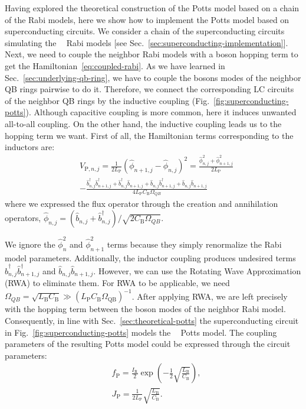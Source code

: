 \documentclass[reprint, aps, prx, amsmath, amssymb, longbibliography, superscriptaddress]{revtex4-2}
\DeclareMathOperator{\Zthree}{\mathbb{Z}_3}
\begin{document}
Having explored the theoretical construction of the Potts model based on a chain of the Rabi models, here we show how to implement the Potts model based on superconducting circuits. We consider a chain of the superconducting circuits simulating the $\Zthree$ Rabi models [see Sec.~\ref{sec:superconducting-implementation}]. Next, we need to couple the neighbor Rabi models with a boson hopping term to get the Hamiltonian~\eqref{eq:coupled-rabi}. As we have learned in Sec.~\ref{sec:underlying-qb-ring}, we have to couple the bosons modes of the neighbor QB rings pairwise to do it. Therefore, we connect the corresponding LC circuits of the neighbor QB rings by the inductive coupling (Fig.~\ref{fig:superconducting-potts}). Although capacitive coupling is more common, here it induces unwanted  all-to-all coupling. On the other hand, the inductive coupling leads us to the hopping term we want. First of all, the Hamiltonian terms corresponding to the inductors are:
\begin{equation}
\begin{aligned}
    &V_{\text{P},n,j} = \frac{1}{2L_{\text{P}}} (\hat \phi_{n+1,j} - \hat \phi_{n,j})^2 = \frac{\hat \phi_{n,j}^2 + \hat \phi_{n+1,j}^2}{2L_{\text{P}}} \\
    &- \frac{\hat b^{\dagger}_{n,j} \hat b^{\dagger}_{n+1,j} + \hat b^{\dagger}_{n,j} \hat b_{n+1,j} + \hat b_{n,j} \hat b^{\dagger}_{n+1,j} + \hat b_{n,j} \hat b_{n+1,j}}{4L_{\text{P}}C_{\text{B}}\Omega_{QB}} 
\end{aligned}
\end{equation}
where we expressed the flux operator through the creation and annihilation operators, $\hat \phi_{n,j} = (\hat b_{n,j} + \hat b_{n,j}^{\dagger})/\sqrt{2C_{\text{B}} \Omega_{QB}}$.

We ignore the $ \hat \phi_n^2 $ and $ \hat \phi_{n+1}^2 $ terms because they simply renormalize the Rabi model parameters. Additionally, the inductor coupling produces undesired terms $\hat b^{\dagger}_{n,j} \hat b^{\dagger}_{n+1,j}$ and $\hat b_{n,j} \hat b_{n+1,j}$. However, we can use the Rotating Wave Approximation (RWA) to eliminate them. For RWA to be applicable, we need $\Omega_{QB} = \sqrt{L_{\text{B}} C_{\text{B}}} \gg (L_{\text{P}} C_{\text{B}} \Omega_{\text{QB}})^{-1}$. After applying RWA, we are left precisely with the hopping term between the boson modes of the neighbor Rabi model. Consequently, in line with Sec.~\ref{sec:theoretical-potts} the superconducting circuit in Fig.~\ref{fig:superconducting-potts} models the $\Zthree$ Potts model. The coupling parameters of the resulting Potts model could be expressed through the circuit parameters:
\begin{equation}
\begin{aligned}
    &f_{\text{P}} = \frac{I_{\text{R}}}{2} \exp\left(-\frac{1}{2}\sqrt{\frac{L_{\text{B}}}{C_{\text{B}}}}\right), \\
    &J_{\text{P}} = \frac{1}{2L_{\text{P}}}\sqrt{\frac{L_{\text{B}}}{C_{\text{B}}}}. 
\end{aligned}
\end{equation}
\end{document}
